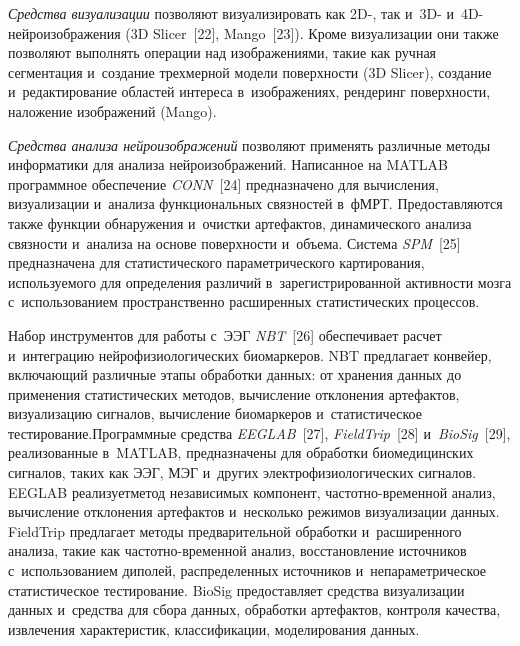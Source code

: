 \begin{multicols}{2}
    \textit{Средства визуализации} позволяют визуализировать как 2D-, так 
и~3D- и~4D-ней\-ро\-изоб\-ра\-же\-ния (3D Slicer~[22], Mango~[23]). Кроме 
визуализации они также позволяют выполнять операции над изображениями, 
такие как ручная сегментация и~создание трехмерной модели поверхности 
(3D Slicer), создание и~редактирование областей интереса в~изображениях, 
рендеринг поверхности, наложение изоб\-ра\-же\-ний (Mango).
    
    \textit{Средства анализа нейроизображений} позволяют применять 
различные методы информатики для анализа нейроизображений. Написанное 
на \mbox{MATLAB} программное обеспечение \textit{CONN}~[24] предназначено 
для вычисления, визуализации и~ана\-ли\-за функциональных связностей 
в~\mbox{фМРТ}. Пред\-остав\-ля\-ют\-ся также функции обнаружения и~очистки 
артефактов, динамического анализа связности и~анализа на основе 
по\-верх\-ности и~\mbox{объема}. Сис\-те\-ма \textit{SPM}~[25] предназначена для 
статистического параметрического картирования, используемого для 
определения различий в~зарегистрированной активности мозга 
с~использованием пространственно расширенных статистических процессов.
    
    Набор инструментов для работы с~ЭЭГ \textit{NBT}~[26] обеспечивает 
расчет и~интеграцию ней\-ро\-фи\-зио\-логических биомаркеров. NBT предлагает 
конвей\-ер, включающий различные этапы обработки данных: от хранения 
данных до применения статистических методов, вычисление отклонения 
\mbox{артефактов}, визуализацию сигналов, вычисление биомаркеров 
и~статистическое тестирование.\linebreak Программные средства 
\textit{EEGLAB}~[27], \textit{FieldTrip}~[28] и~\textit{BioSig}~[29], 
реализованные в~MATLAB, предназначены для обработки биомедицинских 
сигналов, таких как ЭЭГ, МЭГ и~других электрофизиологических сигналов. 
EEGLAB реализует\linebreak метод независимых компонент,  
час\-тот\-но-вре\-мен\-ной анализ, вычисление отклонения артефактов 
и~несколько режимов визуализации данных. \mbox{FieldTrip} предлагает методы 
предварительной об\-работки и~расширенного анализа, такие как 
час\-тот\-но-вре\-мен\-ной анализ, восстановление источников с~использованием диполей, 
распределенных источников и~непараметрическое статистическое 
тес\-тирование. BioSig предоставляет средства визуализации данных 
и~средства для сбора данных, обработки артефактов, контроля качества, 
извлечения характеристик, классификации, моделирования данных.
{ %

}
\end{multicols}
